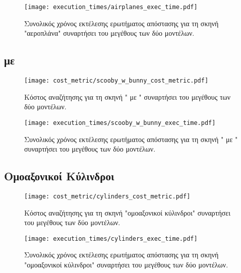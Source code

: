 \begin{figure}[H]
    \centering
    \texttt{[image: execution\_times/airplanes\_exec\_time.pdf]}
    \caption[Συνολικός Χρόνος Εκτέλεσης για "αεροπλάνα"] {
        Συνολικός χρόνος εκτέλεσης ερωτήματος απόστασης 
        για τη σκηνή "αεροπλάνα" συναρτήσει του μεγέθους των δύο μοντέλων.
    }
\end{figure}

\subsection{ με }
\begin{figure}[H]
    \centering
    \texttt{[image: cost\_metric/scooby\_w\_bunny\_cost\_metric.pdf]}
    \caption[Κόστος Αναζήτησης για " με "] {
        Κόστος αναζήτησης για τη σκηνή " με " συναρτήσει 
        του μεγέθους των δύο μοντέλων.
    }
\end{figure}

\begin{figure}[H]
    \centering
    \texttt{[image: execution\_times/scooby\_w\_bunny\_exec\_time.pdf]}
    \caption[Συνολικός Χρόνος Εκτέλεσης για " με "] {
        Συνολικός χρόνος εκτέλεσης ερωτήματος απόστασης 
        για τη σκηνή " με " συναρτήσει του μεγέθους των δύο μοντέλων.
    }
\end{figure}


\subsection{Ομοαξονικοί Κύλινδροι}
\begin{figure}[H]
    \centering
    \texttt{[image: cost\_metric/cylinders\_cost\_metric.pdf]}
    \caption[Κόστος Αναζήτησης για "ομοαξονικοί κύλινδροι"] {
        Κόστος αναζήτησης για τη σκηνή "ομοαξονικοί κύλινδροι" συναρτήσει 
        του μεγέθους των δύο μοντέλων.
    }
\end{figure}

\begin{figure}[H]
    \centering
    \texttt{[image: execution\_times/cylinders\_exec\_time.pdf]}
    \caption[Συνολικός Χρόνος Εκτέλεσης για "ομοαξονικοί κύλινδροι"] {
        Συνολικός χρόνος εκτέλεσης ερωτήματος απόστασης 
        για τη σκηνή "ομοαξονικοί κύλινδροι" συναρτήσει του μεγέθους των δύο μοντέλων.
    }
\end{figure}


